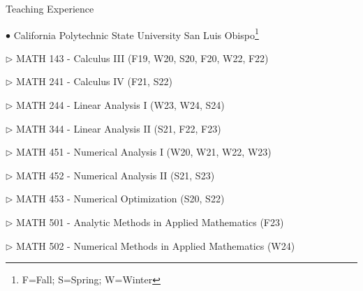 \documentclass[10pt]{article} %
\newenvironment{outerlist}[1][\enskip\textbullet]%
        {\begin{itemize}[#1]}{\end{itemize}%
         \vspace{-.6\baselineskip}}
\newenvironment{innerlist}[1][\enskip\textbullet]%
        {\begin{compactitem}[#1]}{\end{compactitem}}
\begin{document}
\begin{section}{Teaching Experience}
\begin{outerlist}

\item[$\bullet$] \vskip -7mm 
California Polytechnic State University San Luis Obispo\footnote{\label{note1}F=Fall; S=Spring; W=Winter}
\begin{innerlist}
\item[$\triangleright$] MATH 143 - Calculus III (F19, W20, S20, F20, W22, F22)
\item[$\triangleright$] MATH 241 - Calculus IV (F21, S22)
\item[$\triangleright$] MATH 244 - Linear Analysis I (W23, W24, S24)
\item[$\triangleright$] MATH 344 - Linear Analysis II (S21, F22, F23)
\item[$\triangleright$] MATH 451 - Numerical Analysis I (W20, W21, W22, W23)
\item[$\triangleright$] MATH 452 - Numerical Analysis II (S21, S23)
\item[$\triangleright$] MATH 453 - Numerical Optimization (S20, S22)
\item[$\triangleright$] MATH 501 - Analytic Methods in Applied Mathematics (F23)
\item[$\triangleright$] MATH 502 - Numerical Methods in Applied Mathematics (W24)
\end{innerlist}


\end{outerlist}
\end{section}
\end{document}
